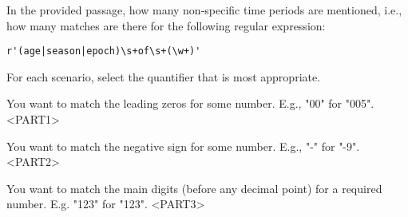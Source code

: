 \documentclass[addpoints]{exam}
\begin{document}
\begin{questions}
\begin{minipage}{\textwidth}
\end{minipage}





\vspace{1cm}

\begin{minipage}{\textwidth}

\question[10]

In the provided passage, how many non-specific time periods are mentioned,
i.e., how many matches are there for the following regular expression:

\begin{lstlisting}
r'(age|season|epoch)\s+of\s+(\w+)'
\end{lstlisting}

\vspace{0.5cm}

\vspace{3cm}

\end{minipage}





\vspace{1cm}

\begin{minipage}{\textwidth}

\question[5]

For each scenario, select the quantifier that is most appropriate. \newline


You want to match the leading zeros for some number. E.g., "00" for "005". \newline
\textsc{<PART1>} \newline


You want to match the negative sign for some number. E.g., "-" for "-9". \newline
\textsc{<PART2>} \newline


You want to match the main digits (before any decimal point) for a required number. E.g. "123" for "123". \newline
\textsc{<PART3>} \newline


\vspace{0.2cm}


\end{minipage}
\end{questions}
\end{document}
